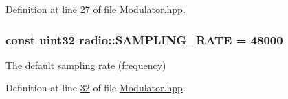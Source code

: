 Definition at line \hyperlink{Modulator_8hpp_source_l00027}{27} of file \hyperlink{Modulator_8hpp_source}{Modulator.\+hpp}.

\hypertarget{namespaceradio_a284213fea4beed2f74bb936927cbe654}{
\subsubsection[{S\+A\+M\+P\+L\+I\+N\+G\+\_\+\+R\+A\+T\+E}]{\setlength{\rightskip}{0pt plus 5cm}const {\bf uint32} radio\+::\+S\+A\+M\+P\+L\+I\+N\+G\+\_\+\+R\+A\+T\+E = 48000}}\label{namespaceradio_a284213fea4beed2f74bb936927cbe654}
The default sampling rate (frequency) 

Definition at line \hyperlink{Modulator_8hpp_source_l00032}{32} of file \hyperlink{Modulator_8hpp_source}{Modulator.\+hpp}.

